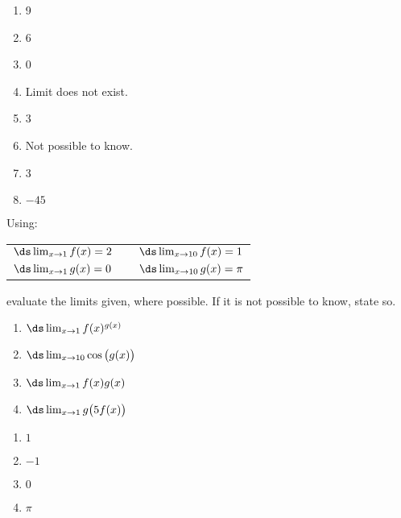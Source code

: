 \begin{enumialphparenastyle}
\begin{ex}
\begin{sol}
\begin{enumerate}
\item 
{9}
\item
{6}
\item
{0}
\item 
{Limit does not exist.}
\item
{3}
\item 
{Not possible to know.}
\item 
{3}
\item 
{$-45$}
\end{enumerate}
\end{sol}

\end{ex}

\begin{ex}
\noindent Using:

\begin{tabular}{lll}
$\ds \lim_{x\to1}f(x) = 2$ & \quad\quad &$\ds \lim_{x\to10} f(x) = 1$\\
$\ds \lim_{x\to1}g(x) = 0$ &  & $\ds \lim_{x\to10} g(x) = \pi$
\end{tabular}

\noindent evaluate the limits given, where possible. If it is not possible to know, state so.
\begin{enumerate}
\item {$\ds \lim_{x\to1}f(x)^{g(x)}$}

\item {$\ds \lim_{x\to10}\cos \big(g(x)\big)$}

\item {$\ds \lim_{x\to1}f(x)g(x)$}

\item {$\ds \lim_{x\to1}g\big(5f(x)\big)$}

\end{enumerate}

\begin{sol}
\begin{enumerate}
\item {$1$}
\item {$-1$}
\item {$0$}
\item {$\pi$}
\end{enumerate}
\end{sol}

\end{ex}




\end{enumialphparenastyle}
